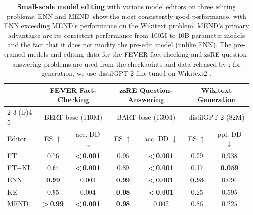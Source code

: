 \documentclass{article}
\newcommand{\name}{MEND}
\newcommand{\textlt}[1]{\textless\,#1\phantom{\textless\,}}
\newcommand{\textgt}[1]{\textgreater\,#1\phantom{\textgreater\,}}
\begin{document}
\begin{table}
    \centering
    \small
    \begin{tabular}{lcccccc}
    \toprule
        & \multicolumn{2}{c}{\textbf{FEVER Fact-Checking}} & \multicolumn{2}{c}{\textbf{zsRE Question-Answering}} & \multicolumn{2}{c}{\textbf{Wikitext Generation}}  \\
        \cmidrule(lr){2-3} \cmidrule(lr){4-5} \cmidrule{6-7}
        & \multicolumn{2}{c}{BERT-base (110M)} & \multicolumn{2}{c}{BART-base (139M)} & \multicolumn{2}{c}{distilGPT-2 (82M)} \\
        \midrule
        Editor & ES $\uparrow$ & acc. DD $\downarrow$ & ES $\uparrow$ & acc. DD $\downarrow$ & ES $\uparrow$ & ppl. DD $\downarrow$ \\
        \midrule
        FT & 0.76 & \textbf{\textlt{0.001}} & 0.96 & \textbf{\textlt{0.001}} & 0.29 & 0.938 \\
        FT+KL & 0.64 & \textbf{\textlt{0.001}} & 0.89 & \textbf{\textlt{0.001}} & 0.17 & \textbf{0.059} \\
        ENN & \textbf{0.99} & 0.003 & \textbf{0.99} & \textbf{\textlt{0.001}} & \textbf{0.93} & 0.094 \\
        KE & 0.95 & 0.004 & \textbf{0.98} & \textbf{\textlt{0.001}} & 0.25 & 0.595 \\
        \name & \textbf{\textgt{0.99}} & \textbf{\textlt{0.001}} & \textbf{0.98} & 0.002 & 0.86 & 0.225 \\
        \bottomrule
    \end{tabular}
    \caption{\textbf{Small-scale model editing} with various model editors on three editing problems. ENN and \name~show the most consistently good performance, with ENN exceeding \name's performance on the Wikitext problem. \name's primary advantages are its consistent performance from 100M to 10B parameter models and the fact that it does not modify the pre-edit model (unlike ENN). The pre-trained models and editing data for the FEVER fact-checking and zsRE question-answering problems are used from the checkpoints and data released by \citet{Cao2021EditingFK}; for generation, we use distilGPT-2 fine-tuned on Wikitext2 \citep{distilgpt2}.}
    \label{tab:small_models}
\end{table}
\end{document}
